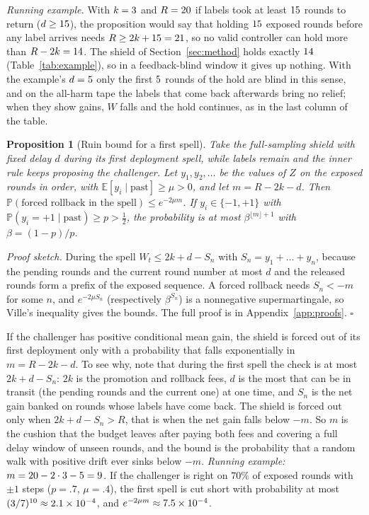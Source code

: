 \documentclass[10pt]{article}
\theoremstyle{plain}
\newtheorem{proposition}{Proposition}
\theoremstyle{definition}
\newcommand{\PP}{\mathbb{P}}
\newcommand{\E}{\mathbb{E}}
\begin{document}
\emph{Running example.} With $k=3$ and $R=20$ if labels took at least $15$ rounds to return ($d\ge15$), the proposition would say that holding $15$ exposed rounds before any label arrives needs $R\ge2k+15=21$, so no valid controller can hold more than $R-2k=14$. The shield of Section~\ref{sec:method} holds exactly $14$ (Table~\ref{tab:example}), so in a feedback-blind window it gives up nothing. With the example's $d=5$ only the first $5$ rounds of the hold are blind in this sense, and on the all-harm tape the labels that come back afterwards bring no relief; when they show gains, $W$ falls and the hold continues, as in the last column of the table.

\begin{proposition}[Ruin bound for a first spell]\label{prop:price}
Take the full-sampling shield with fixed delay $d$ during its first deployment spell, while labels remain and the inner rule keeps proposing the challenger. Let $y_1,y_2,\dots$ be the values of $Z$ on the exposed rounds in order, with $\E[y_i\mid\text{past}]\ge\mu>0$, and let $m=R-2k-d$. Then $\PP(\text{forced rollback in the spell})\le e^{-2\mu m}$. If $y_i\in\{-1,+1\}$ with $\PP(y_i=+1\mid\text{past})\ge p>\tfrac12$, the probability is at most $\beta^{\lfloor m\rfloor+1}$ with $\beta=(1-p)/p$.
\end{proposition}
\emph{Proof sketch.} During the spell $W_t\le2k+d-S_n$ with $S_n=y_1+\dots+y_n$, because the pending rounds and the current round number at most $d$ and the released rounds form a prefix of the exposed sequence. A forced rollback needs $S_n<-m$ for some $n$, and $e^{-2\mu S_n}$ (respectively $\beta^{S_n}$) is a nonnegative supermartingale, so Ville's inequality gives the bounds. The full proof is in Appendix~\ref{app:proofs}. \hfill$\square$

If the challenger has positive conditional mean gain, the shield is forced out of its first deployment only with a probability that falls exponentially in $m=R-2k-d$. To see why, note that during the first spell the check is at most $2k+d-S_n$: $2k$ is the promotion and rollback fees, $d$ is the most that can be in transit (the pending rounds and the current one) at one time, and $S_n$ is the net gain banked on rounds whose labels have come back. The shield is forced out only when $2k+d-S_n>R$, that is when the net gain falls below $-m$. So $m$ is the cushion that the budget leaves after paying both fees and covering a full delay window of unseen rounds, and the bound is the probability that a random walk with positive drift ever sinks below $-m$. \emph{Running example:} $m=20-2\cdot3-5=9$. If the challenger is right on $70\%$ of exposed rounds with $\pm1$ steps ($p=.7$, $\mu=.4$), the first spell is cut short with probability at most $(3/7)^{10}\approx2.1\times10^{-4}$, and $e^{-2\mu m}\approx7.5\times10^{-4}$.
\end{document}
